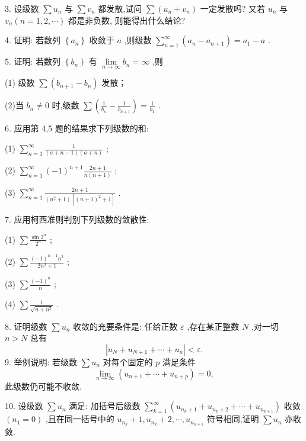 3. 设级数 \(\sum {u}_{n}\) 与 \(\sum {v}_{n}\) 都发散,试问 \(\sum \left( {{u}_{n} + {v}_{n}}\right)\) 一定发散吗? 又若 \({u}_{n}\) 与 \({v}_{n}\left( {n = 1,2,\cdots }\right)\) 都是非负数, 则能得出什么结论?

4. 证明: 若数列 \(\left\{  {a}_{n}\right\}\) 收敛于 \(a\) ,则级数 \(\mathop{\sum }\limits_{{n = 1}}^{\infty }\left( {{a}_{n} - {a}_{n + 1}}\right)  = {a}_{1} - a\) .

5. 证明: 若数列 \(\left\{  {b}_{n}\right\}\) 有 \(\mathop{\lim }\limits_{{n \rightarrow  \infty }}{b}_{n} = \infty\) ,则

(1) 级数 \(\sum \left( {{b}_{n + 1} - {b}_{n}}\right)\) 发散；

(2)当 \({b}_{n} \neq  0\) 时,级数 \(\sum \left( {\frac{1}{{b}_{n}} - \frac{1}{{b}_{n + 1}}}\right)  = \frac{1}{{b}_{1}}\) .

6. 应用第 4,5 题的结果求下列级数的和:

(1) \(\mathop{\sum }\limits_{{n = 1}}^{\infty }\frac{1}{\left( {a + n - 1}\right) \left( {a + n}\right) }\) ;

(2) \(\mathop{\sum }\limits_{{n = 1}}^{\infty }{\left( -1\right) }^{n + 1}\frac{{2n} + 1}{n\left( {n + 1}\right) }\) ;

(3) \(\mathop{\sum }\limits_{{n = 1}}^{\infty }\frac{{2n} + 1}{\left( {{n}^{2} + 1}\right) \left\lbrack  {{\left( n + 1\right) }^{2} + 1}\right\rbrack  }\) .

7. 应用柯西准则判别下列级数的敛散性:

(1) \(\sum \frac{\sin {2}^{n}}{{2}^{n}}\) ;

(2) \(\sum \frac{{\left( -1\right) }^{n - 1}{n}^{2}}{2{n}^{2} + 1}\) ;

(3) \(\sum \frac{{\left( -1\right) }^{n}}{n}\) ;

(4) \(\sum \frac{1}{\sqrt{n + {n}^{2}}}\) .

8. 证明级数 \(\sum {u}_{n}\) 收敛的充要条件是: 任给正数 \(\varepsilon\) ,存在某正整数 \(N\) ,对一切 \(n > N\) 总有
\[
\left| {{u}_{N} + {u}_{N + 1} + \cdots  + {u}_{n}}\right|  < \varepsilon .
\]
9. 举例说明: 若级数 \(\sum {u}_{n}\) 对每个固定的 \(p\) 满足条件
\[
\mathop{\lim }\limits_{{n \rightarrow  \infty }}\left( {{u}_{n + 1} + \cdots  + {u}_{n + p}}\right)  = 0,
\]
此级数仍可能不收敛.

10. 设级数 \(\sum {u}_{n}\) 满足: 加括号后级数 \(\mathop{\sum }\limits_{{k = 1}}^{\infty }\left( {{u}_{{n}_{k} + 1} + {u}_{{n}_{k} + 2} + \cdots  + {u}_{{n}_{k + 1}}}\right)\) 收敛 \(\left( {{n}_{1} = 0}\right)\) ,且在同一括号中的 \({u}_{{n}_{k}} + 1,{u}_{{n}_{k}} + 2,\cdots ,{u}_{{n}_{k + 1}}\) 符号相同,证明 \(\sum {u}_{n}\) 亦收敛.

